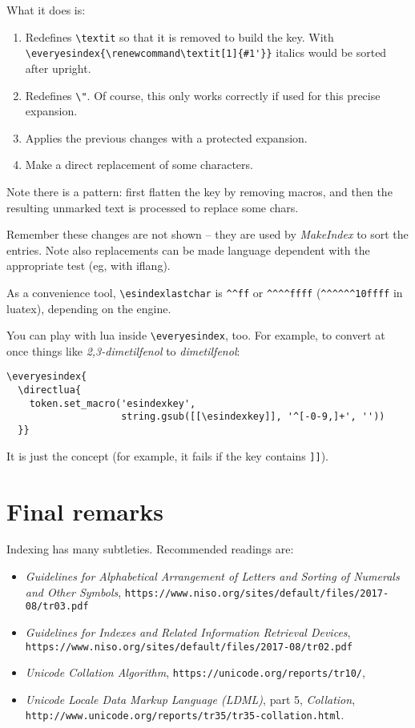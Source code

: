 \documentclass[a4paper]{ltxguide}
\begin{document}
What it does is:
\begin{enumerate}
\item Redefines \verb|\textit| so that it is removed to build the key.
With \verb|\everyesindex{\renewcommand\textit[1]{#1'}}| italics would
be sorted after upright.

\item Redefines \verb|\"|. Of course, this only works correctly if used
for this precise expansion.

\item Applies the previous changes with a protected expansion.

\item Make a direct replacement of some characters.

\end{enumerate}
Note there is a pattern: first flatten the key by removing macros, and
then the resulting unmarked text is processed to replace some chars.

Remember these changes are not shown -- they are used by
\textit{MakeIndex} to sort the entries. Note also replacements can be
made language dependent with the appropriate test (eg, with
\textsf{iflang}).

As a convenience tool, \verb|\esindexlastchar| is \verb|^^ff| or
\verb|^^^^ffff| (\verb|^^^^^^10ffff| in \textsf{luatex}), depending on
the engine.

You can play with \textsf{lua} inside \verb|\everyesindex|, too. For
example, to convert at once things like \textit{2,3-dimetilfenol} to
\textit{dimetilfenol}:
\begin{verbatim}
\everyesindex{
  \directlua{
    token.set_macro('esindexkey',
                    string.gsub([[\esindexkey]], '^[-0-9,]+', ''))
  }}
\end{verbatim}

It is just the concept (for example, it fails if the key contains
\verb|]]|).

\section{Final remarks}

Indexing has many subtleties. Recommended readings are:
\begin{itemize}
  \item \textit{Guidelines for Alphabetical Arrangement of Letters and
  Sorting of Numerals and Other Symbols},
  \verb|https://www.niso.org/sites/default/files/2017-08/tr03.pdf|
  \item \textit{Guidelines for Indexes and Related Information Retrieval
  Devices},
  \verb|https://www.niso.org/sites/default/files/2017-08/tr02.pdf|
  \item \textit{Unicode Collation Algorithm},
  \verb|https://unicode.org/reports/tr10/|,
  \item \textit{Unicode Locale Data Markup Language (LDML)}, part 5,
  \textit{Collation},
  \verb|http://www.unicode.org/reports/tr35/tr35-collation.html|.
\end{itemize}
\end{document}
